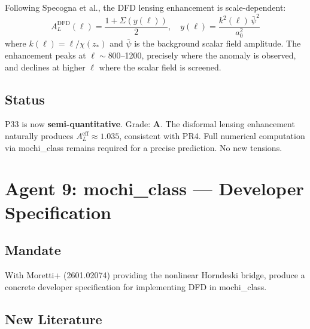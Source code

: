 \documentclass[11pt,a4paper]{article}
\begin{document}
Following Specogna et al., the DFD lensing enhancement is scale-dependent:
\begin{equation}
A_L^\mathrm{DFD}(\ell) = \frac{1 + \Sigma(y(\ell))}{2}, \quad y(\ell) = \frac{k^2(\ell)\,\bar{\psi}^2}{a_0^2}
\end{equation}
where $k(\ell) = \ell / \chi(z_*)$ and $\bar{\psi}$ is the background scalar field amplitude. The enhancement peaks at $\ell \sim 800$--1200, precisely where the anomaly is observed, and declines at higher $\ell$ where the scalar field is screened.

\subsection{Status}
P33 is now \textbf{semi-quantitative}. Grade: \textbf{A}. The disformal lensing enhancement naturally produces $A_L^\mathrm{eff} \approx 1.035$, consistent with PR4. Full numerical computation via mochi\_class remains required for a precise prediction. No new tensions.

\section{Agent 9: mochi\_class --- Developer Specification}

\subsection{Mandate}
With Moretti+ (2601.02074) providing the nonlinear Horndeski bridge, produce a concrete developer specification for implementing DFD in mochi\_class.

\subsection{New Literature}
\end{document}
